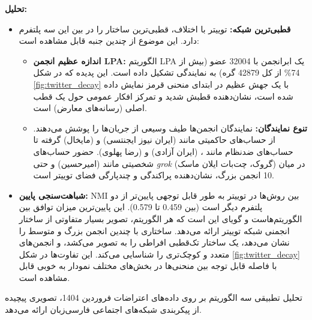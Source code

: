 \documentclass{article}
\begin{document}
	\textbf{تحلیل:}
	\begin{itemize}
		\item \textbf{قطبی‌ترین شبکه:} توییتر با اختلاف، قطبی‌ترین ساختار را در بین این سه پلتفرم دارد. این موضوع از چندین جنبه قابل مشاهده است:
		\begin{itemize}
			\item \textbf{اندازه عظیم انجمن LPA:} الگوریتم LPA یک ابرانجمن با 32004 عضو (بیش از 74\% از کل 42879 گره) به نمایندگی  تشکیل داده است. این پدیده که در شکل \ref{fig:twitter_decay} با یک جهش عظیم در ابتدای منحنی قرمز نمایش داده شده است، نشان‌دهنده قطبش شدید و تمرکز افکار عمومی حول یک قطب اصلی (رسانه‌های معارض) است.
			\item \textbf{تنوع نمایندگان:} نمایندگان انجمن‌ها طیف وسیعی از جریان‌ها را پوشش می‌دهند. از حساب‌های حاکمیتی مانند  (ایران نیوز ایجنتسی) و  (مایخال) گرفته تا حساب‌های ضدنظام مانند ،  (ایران آزادی) و  (رضا پهلوی). حضور حساب‌های شخصیتی مانند  (امیرحسین) و حتی \textit{grok} (گروک، چت‌بات ایلان ماسک) در میان 10 انجمن بزرگ، نشان‌دهنده پراکندگی و چندپارگی فضای توییتر است.
		\end{itemize}
		\item \textbf{شباهت‌سنجی پایین:} NMI بین روش‌ها در توییتر به طور قابل توجهی پایین‌تر از دو پلتفرم دیگر است (بین 0.459 تا 0.579). این پایین‌ترین میزان توافق بین الگوریتم‌هاست و گویای این است که هر الگوریتم، تصویر بسیار متفاوتی از ساختار انجمنی شبکه توییتر ارائه می‌دهد.  ساختاری با چندین انجمن بزرگ و متوسط را نشان می‌دهد،  یک ساختار تک‌قطبی افراطی را به تصویر می‌کشد، و  انجمن‌های متعدد و کوچک‌تری را شناسایی می‌کند. این تفاوت‌ها در شکل \ref{fig:twitter_decay} با فاصله قابل توجه بین منحنی‌ها در بخش‌های مختلف نمودار به خوبی قابل مشاهده است.
	\end{itemize}
	تحلیل تطبیقی سه الگوریتم بر روی داده‌های اعتراضات فروردین 1404، تصویری پیچیده از پیکربندی شبکه‌های اجتماعی فارسی‌زبان ارائه می‌دهد.
\end{document}
